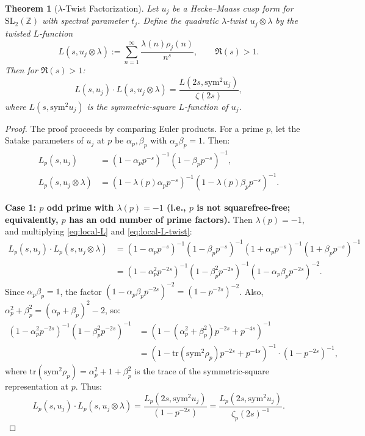 \documentclass[11pt,a4paper]{article}
\theoremstyle{plain}
\newtheorem{theorem}{Theorem}[section]
\theoremstyle{definition}
\newcommand{\sym}{\mathrm{sym}}
\newcommand{\SL}{\mathrm{SL}}
\newcommand{\tr}{\mathrm{tr}}
\newcommand{\ZZ}{\mathbb{Z}}
\begin{document}
\begin{theorem}[$\lambda$-Twist Factorization]
\label{thm:lambda-twist}
Let $u_j$ be a Hecke--Maass cusp form for $\SL_2(\ZZ)$ with spectral parameter $t_j$. Define the \emph{quadratic $\lambda$-twist} $u_j \otimes \lambda$ by the twisted $L$-function
\[
L(s, u_j \otimes \lambda) := \sum_{n=1}^\infty \frac{\lambda(n) \rho_j(n)}{n^s}, \qquad \Re(s) > 1.
\]
Then for $\Re(s) > 1$:
\begin{equation}
\label{eq:factorization}
L(s, u_j) \cdot L(s, u_j \otimes \lambda) = \frac{L(2s, \sym^2 u_j)}{\zeta(2s)},
\end{equation}
where $L(s, \sym^2 u_j)$ is the symmetric-square $L$-function of $u_j$.
\end{theorem}

\begin{proof}
The proof proceeds by comparing Euler products. For a prime $p$, let the Satake parameters of $u_j$ at $p$ be $\alpha_p, \beta_p$ with $\alpha_p \beta_p = 1$. Then:
\begin{align}
L_p(s, u_j) &= (1 - \alpha_p p^{-s})^{-1}(1 - \beta_p p^{-s})^{-1}, \label{eq:local-L} \\
L_p(s, u_j \otimes \lambda) &= (1 - \lambda(p)\alpha_p p^{-s})^{-1}(1 - \lambda(p)\beta_p p^{-s})^{-1}. \label{eq:local-L-twist}
\end{align}

\textbf{Case 1: $p$ odd prime with $\lambda(p) = -1$ (i.e., $p$ is not squarefree-free; equivalently, $p$ has an odd number of prime factors).} Then $\lambda(p) = -1$, and multiplying \eqref{eq:local-L} and \eqref{eq:local-L-twist}:
\begin{align*}
L_p(s, u_j) \cdot L_p(s, u_j \otimes \lambda) &= (1 - \alpha_p p^{-s})^{-1}(1 - \beta_p p^{-s})^{-1} (1 + \alpha_p p^{-s})^{-1}(1 + \beta_p p^{-s})^{-1} \\
&= (1 - \alpha_p^2 p^{-2s})^{-1}(1 - \beta_p^2 p^{-2s})^{-1} (1 - \alpha_p \beta_p p^{-2s})^{-2}.
\end{align*}
Since $\alpha_p \beta_p = 1$, the factor $(1 - \alpha_p\beta_p p^{-2s})^{-2} = (1 - p^{-2s})^{-2}$. Also, $\alpha_p^2 + \beta_p^2 = (\alpha_p + \beta_p)^2 - 2$, so:
\begin{align*}
(1 - \alpha_p^2 p^{-2s})^{-1}(1 - \beta_p^2 p^{-2s})^{-1} &= (1 - (\alpha_p^2 + \beta_p^2) p^{-2s} + p^{-4s})^{-1} \\
&= (1 - \tr(\sym^2 \rho_p) p^{-2s} + p^{-4s})^{-1} \cdot (1 - p^{-2s})^{-1},
\end{align*}
where $\tr(\sym^2 \rho_p) = \alpha_p^2 + 1 + \beta_p^2$ is the trace of the symmetric-square representation at $p$. Thus:
\[
L_p(s, u_j) \cdot L_p(s, u_j \otimes \lambda) = \frac{L_p(2s, \sym^2 u_j)}{(1 - p^{-2s})} = \frac{L_p(2s, \sym^2 u_j)}{\zeta_p(2s)^{-1}}.
\]


\end{proof}
\end{document}
